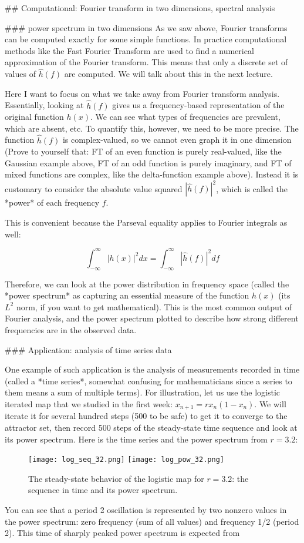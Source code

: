 ## Computational: Fourier transform in two dimensions, spectral analysis

### power spectrum in two dimensions
As we saw above, Fourier transforms can be computed exactly for some simple functions. In practice computational methods like the Fast Fourier Transform are used to find a numerical approximation of the Fourier transform. This means that only a discrete set of values of  $\widehat h(f)$ are computed. We will talk about this in the next lecture.

Here I want to focus on what we take away from Fourier transform analysis. Essentially, looking at $\widehat h(f)$ gives us a frequency-based representation of the original function  $h(x)$. We can see what types of frequencies are prevalent, which are absent, etc. To quantify this, however, we need to be more precise. The function  $\widehat h(f)$ is complex-valued, so we cannot even graph it in one dimension (Prove to yourself that: FT of an even function is purely real-valued, like the Gaussian example above, FT of an odd function is purely imaginary, and FT of mixed functions are complex, like the delta-function example above). Instead it is customary to consider the absolute value squared  $|\widehat h(f)|^2$, which is called the *power* of each frequency $f$.

This is convenient because the Parseval equality applies to Fourier integrals as  well:

$$ \int_{-\infty}^\infty |h(x)|^2 dx =  \int_{-\infty}^\infty |\widehat h(f)|^2 df $$

Therefore, we can look at the power distribution in frequency space (called the *power spectrum* as capturing an essential measure of the function $h(x)$ (its $L^2$ norm, if you want to get mathematical). This is the most common output of Fourier analysis, and the power spectrum plotted to describe how strong different frequencies are in the observed data.


### Application: analysis of time series data

One example of such application is the analysis of measurements recorded in time (called a *time series*, somewhat confusing for mathematicians since a series to them means a sum of multiple terms). For illustration, let us use the logistic iterated map that we studied in the first week: $x_{n+1} = rx_n(1-x_n)$. We will iterate it for several hundred steps (500 to be safe) to get it to converge to the attractor set, then record 500 steps of the steady-state time sequence and look at its power spectrum. Here is the time series and the power spectrum from $r=3.2$:
\begin{figure}[htbp] %
   \centering
   \texttt{[image: log\_seq\_32.png]}
   \texttt{[image: log\_pow\_32.png]}  
   \caption{The steady-state behavior of the logistic map for $r=3.2$: the sequence in time and its power spectrum.}
\end{figure}
You can see that a period 2 oscillation is represented by two nonzero values in the power spectrum: zero frequency (sum of all values) and frequency 1/2 (period 2). This time of sharply peaked power spectrum is expected from 

